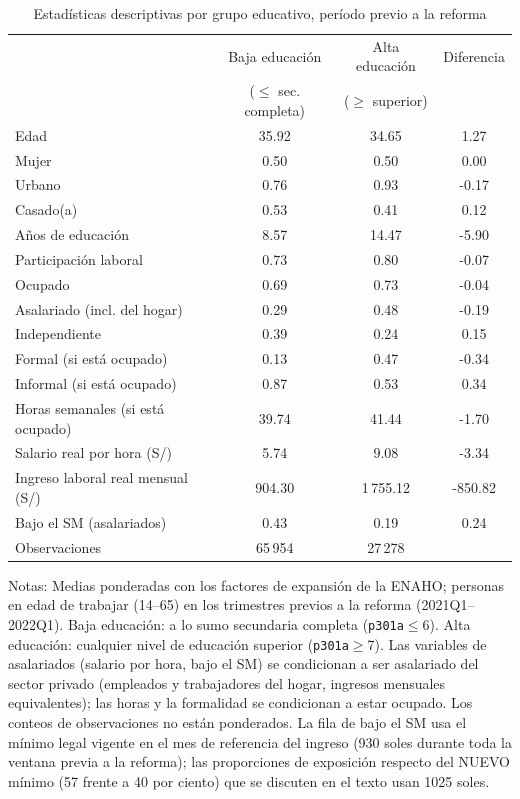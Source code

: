 \begin{table}[!tbp]\centering
\caption{Estadísticas descriptivas por grupo educativo, período previo a la reforma}\label{tab:desc}
\begin{threeparttable}
\begin{tabular}{lccc}
\toprule
 & Baja educación & Alta educación & Diferencia \\
 & ($\le$ sec. completa) & ($\ge$ superior) & \\
\midrule
Edad & 35.92 & 34.65 & 1.27 \\
Mujer & 0.50 & 0.50 & 0.00 \\
Urbano & 0.76 & 0.93 & -0.17 \\
Casado(a) & 0.53 & 0.41 & 0.12 \\
Años de educación & 8.57 & 14.47 & -5.90 \\
Participación laboral & 0.73 & 0.80 & -0.07 \\
Ocupado & 0.69 & 0.73 & -0.04 \\
Asalariado (incl. del hogar) & 0.29 & 0.48 & -0.19 \\
Independiente & 0.39 & 0.24 & 0.15 \\
Formal (si está ocupado) & 0.13 & 0.47 & -0.34 \\
Informal (si está ocupado) & 0.87 & 0.53 & 0.34 \\
Horas semanales (si está ocupado) & 39.74 & 41.44 & -1.70 \\
Salario real por hora (S/) & 5.74 & 9.08 & -3.34 \\
Ingreso laboral real mensual (S/) & 904.30 & 1\,755.12 & -850.82 \\
Bajo el SM (asalariados) & 0.43 & 0.19 & 0.24 \\
\midrule
Observaciones & 65\,954 & 27\,278 & \\
\bottomrule
\end{tabular}
\begin{tablenotes}\footnotesize
\item Notas: Medias ponderadas con los factores de expansión de la ENAHO; personas en edad de trabajar (14--65) en los trimestres previos a la reforma (2021Q1--2022Q1). Baja educación: a lo sumo secundaria completa (\texttt{p301a}$\le$6). Alta educación: cualquier nivel de educación superior (\texttt{p301a}$\ge$7). Las variables de asalariados (salario por hora, bajo el SM) se condicionan a ser asalariado del sector privado (empleados y trabajadores del hogar, ingresos mensuales equivalentes); las horas y la formalidad se condicionan a estar ocupado. Los conteos de observaciones no están ponderados. La fila de bajo el SM usa el mínimo legal vigente en el mes de referencia del ingreso (930 soles durante toda la ventana previa a la reforma); las proporciones de exposición respecto del NUEVO mínimo (57 frente a 40 por ciento) que se discuten en el texto usan 1025 soles.
\end{tablenotes}
\end{threeparttable}\end{table}
